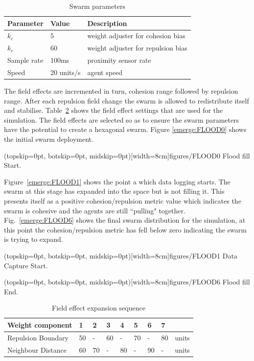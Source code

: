 \documentclass{ieeeaccess}
\begin{document}
\begin{table}[H]
\begin{center}
\begin{tabular}{| p{1.8cm} | p{1.5cm} | p{4.0cm} |}
\hline
\bf Parameter & \bf Value  & \bf Description \\ \hline
$k_c$         & 5          & weight adjuster for cohesion bias\\ \hline
$k_r$         & 60         & weight adjuster for repulsion bias\\ \hline
Sample rate   & 100ms      & proximity sensor rate\\ \hline
Speed         & 20 units/s & agent speed\\ \hline
\end{tabular}\caption{Swarm parameters} \label{tab:FillParameters1}
\end{center}
\end{table}

The field effects are incremented in turn, cohesion range followed by repulsion range. After each repulsion field change the swarm is allowed to redistribute itself and stabilise. Table~\ref{tab:FillSequence} shows the field effect settings that are used for the simulation. The field effects are selected so as to ensure the swarm parameters have the potential to create a hexagonal swarm. Figure \ref{emerge:FLOOD0} shows the initial swarm deployment.

\Figure[t!](topskip=0pt, botskip=0pt, midskip=0pt)[width=8cm]{figures/FLOOD0}
{Flood fill Start.\label{emerge:FLOOD0}}

Figure~\ref{emerge:FLOOD1} shows the point a which data logging starts. The swarm at this stage has expanded into the space but is not filling it. This presents itself as a positive cohesion/repulsion metric value which indicates the swarm is cohesive and the agents are still ``pulling" together. Fig.~\ref{emerge:FLOOD6} shows the final swarm distribution for the simulation, at this point the cohesion/repulsion metric has fell below zero indicating the swarm is trying to expand. 

\Figure[t!](topskip=0pt, botskip=0pt, midskip=0pt)[width=8cm]{figures/FLOOD1}
{Data Capture Start.\label{emerge:FLOOD1}}

\Figure[t!](topskip=0pt, botskip=0pt, midskip=0pt)[width=8cm]{figures/FLOOD6}
{Flood fill End.\label{emerge:FLOOD6}}

\begin{table}[H]
\begin{center}
\begin{tabular}{| p{1.8cm} | p{0.3cm} | p{0.3cm} | p{0.3cm} | p{0.3cm} | p{0.3cm} | p{0.3cm} | p{0.3cm} | p{0.7cm} |}
\hline
\bf Weight \bf component & \bf 1 & \bf 2 & \bf 3 & \bf 4 & \bf 5 & \bf 6 & \bf 7 & \\ \hline
Repulsion Boundary & 50 & -  & 60 & -  & 70 & -  & 80 & units\\  \hline
Neighbour Distance & 60 & 70 & -  & 80 & -  & 90 & -  & units\\  \hline
\end{tabular}\caption{Field effect expansion sequence} \label{tab:FillSequence}
\end{center}
\end{table}
\end{document}
